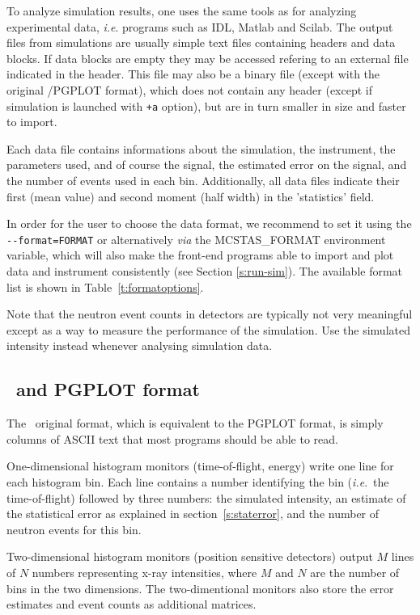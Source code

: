 To analyze simulation results, one uses the same tools as for analyzing
experimental data, \textit{i.e}. programs such as IDL, Matlab and Scilab.
The output files from simulations are usually simple text files containing headers and data blocks. If data blocks are empty they may be accessed refering to an external file indicated in the header. This file may also be a binary file (except with the original \MCX /PGPLOT format), which does not contain any header (except if simulation is launched with \verb|+a| option), but are in turn smaller in size and faster to import.

Each data file contains informations about the simulation, the instrument, the parameters used, and of course the signal, the estimated error on the signal, and the number of events used in each bin. Additionally, all data files indicate their first (mean value) and second moment (half width) in the 'statistics' field.

In order for the user to choose the data format, we recommend to set it using the \verb+--format=FORMAT+ or alternatively {\it via} the MCSTAS\_FORMAT environment variable, which will also make the front-end programs able to import and plot data and instrument consistently (see Section \ref{s:run-sim}). The available format list is shown in Table~\ref{t:formatoptions}. 

Note that the neutron event counts in detectors are typically not very
meaningful except as a way to measure the performance of the
simulation. Use the simulated intensity instead whenever analysing
simulation data.

\subsection{\MCX\ and PGPLOT format}
 
The \MCX\ original format, which is equivalent to the PGPLOT format, is simply columns of ASCII text that most programs should
be able to read.

One-dimensional histogram monitors (time-of-flight, energy)
write one line for each histogram bin. Each line contains a number
identifying the bin (\textit{i.e}.\ the time-of-flight) followed by
three numbers: the simulated intensity, an estimate of the statistical
error as explained in section~\ref{s:staterror}, and the number of
neutron events for this bin.

Two-dimensional histogram monitors (position sensitive detectors)
output $M$ lines of $N$ numbers representing x-ray intensities, where
$M$ and $N$ are the number of bins in the two dimensions. The
two-dimentional monitors also store the error estimates and event counts as additional matrices.

